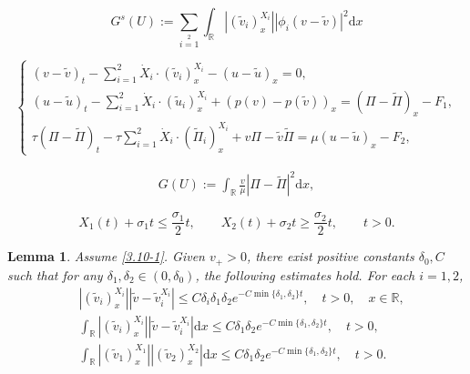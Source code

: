 \documentclass[10pt,a4paper]{amsart}
\newtheorem{lemma}{Lemma}
\newcommand{\SUM}[3]{\sum\limits_{{#1}={#2}}^{#3}}
\newcommand{\dif}{\mathrm{d}}
\begin{document}
\begin{equation}
G^s(U):=\sum\limits_{i=1}\limits^2\int_\mathbb{R}|(\widetilde{v}_i)^{X_i}_{x}| |\phi_i(v -\widetilde{v})|^2\dif x
\end{equation}

\begin{equation}\label{4.1}
\begin{cases}
(v-\widetilde{v})_t-\SUM i 1 2 \dot{X}_i \cdot (\widetilde{v}_i)^{X_i}_x-(u-\widetilde{u})_x=0,\\
(u-\widetilde{u})_t-\SUM i 1 2 \dot{X}_i \cdot (\widetilde{u}_i)^{X_i}_x+\left(p(v)-p(\widetilde{v})\right)_x
=(\Pi-\widetilde{\Pi})_x-F_1,\\
\tau(\Pi-\widetilde{\Pi})_t-\tau\SUM i 1 2\dot{X}_i \cdot (\widetilde{\Pi}_i)^{X_i}_x+v\Pi-\widetilde{v}\widetilde{\Pi}
=\mu(u-\widetilde{u})_x-F_2,
\end{cases}
\end{equation}

\begin{align}\label{26.1b}
 G(U):=\int_\mathbb{R}\frac{v}{\mu}|\Pi-\widetilde{\Pi}|^2\dif x,
\end{align}

\begin{equation}\label{3.10-1}
X_1(t)+\sigma_1t\le \frac{\sigma_1}{2}t,\qquad X_2(t)+\sigma_2t\ge \frac{\sigma_2}{2}t, \qquad t >0.
\end{equation}

\begin{lemma}\label{le4.3}
Assume \eqref{3.10-1}. Given $v_+>0$, there exist positive constants $\delta_0,C$ such that for any $\delta_1,\delta_2\in(0,\delta_0)$, the following estimates hold. For each $i=1,2$,
\begin{align*}
&|(\widetilde{v}_i)_x^{X_i}||\widetilde{v}-\widetilde{v}_i^{X_i}|\le C\delta_i\delta_1\delta_2e^{-C\min\{\delta_1,\delta_2\}t},\quad t>0, \quad x\in \mathbb{R},\\
&\int_\mathbb{R}|(\widetilde{v}_i)_x^{X_i}||\widetilde{v}-\widetilde{v}_i^{X_i}|\dif x\le C\delta_1\delta_2e^{-C\min\{\delta_1,\delta_2\}t},\quad t>0,\\
&\int_\mathbb{R}|(\widetilde{v}_1)_x^{X_1}||(\widetilde{v}_2)_x^{X_2}|\dif x\le
C\delta_1\delta_2e^{-C\min\{\delta_1,\delta_2\}t},\quad t>0.
\end{align*}
\end{lemma}
\end{document}
